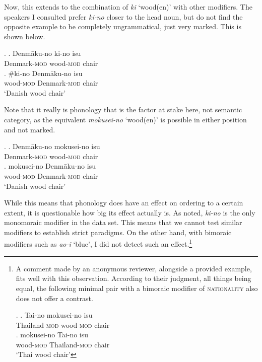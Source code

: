 Now, this extends to the combination of \textit{ki} `wood(en)’ with other modifiers. The speakers I consulted prefer \textit{ki-no} closer to the head noun, but do not find the opposite example to be completely ungrammatical, just very marked. This is shown below. 

\ex. \ag. Denmāku-no ki-no isu\\
Denmark-\textsc{mod} wood-\textsc{mod} chair\\
\bg. \#ki-no Denmāku-no isu\\
wood-\textsc{mod} Denmark-\textsc{mod} chair\\
`Danish wood chair'

Note that it really is phonology that is the factor at stake here, not semantic category, as the equivalent \textit{mokusei-no} `wood(en)’ is possible in either position and not marked.

\ex. \ag. Denmāku-no mokusei-no isu\\
Denmark-\textsc{mod} wood-\textsc{mod} chair\\
\bg. mokusei-no Denmāku-no isu\\
wood-\textsc{mod} Denmark-\textsc{mod} chair\\
`Danish wood chair'

\largerpage[-1]
While this means that phonology does have an effect on ordering to a certain extent, it is questionable how big its effect actually is. As noted, \textit{ki-no} is the only monomoraic modifier in the data set. This means that we cannot test similar modifiers to establish strict paradigms. On the other hand, with bimoraic modifiers such as \textit{ao-i} `blue’, I did not detect such an effect.\footnote{A comment made by an anonymous reviewer, alongside a provided example, fits well with this observation. According to their judgment, all things being equal, the following minimal pair with a bimoraic modifier of \textsc{nationality} also does not offer a contrast.

\par

\ex. \ag. Tai-no mokusei-no isu\\
Thailand-\textsc{mod} wood-\textsc{mod} chair\\
\bg. mokusei-no Tai-no isu\\
wood-\textsc{mod} Thailand-\textsc{mod} chair\\
`Thai wood chair'

\par}




